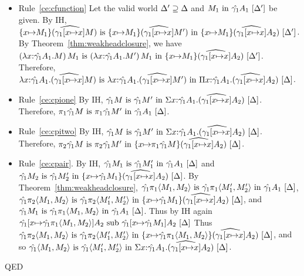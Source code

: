 \documentclass{article}
\theoremstyle{break}
\newcommand{\qed}{\mbox{QED}}
\newcommand{\env}{\gamma}
\newcommand{\envone}{\hat{\env_1}}
\newcommand{\envonex}{\widehat{\env_1[\cvar{\mapsto}\cvar]}}
\newenvironment{proof}{\noindent{\bf Proof:}\hspace*{0.5em}}{\hspace*{\fill}\qed}
\begin{document}
\begin{proof}
\begin{itemize}
\item Rule~\ref{ce:cfunction}
Let the valid world $\Delta'\supseteq\Delta$ and 
$\semanticvalidterm{\world'}{\constructor_1}{\envone\kind_1}$ be given.
By IH, 
$\semanticequivterm{\world'}{\substitute{\cvar}{\constructor_1}{(\envonex\constructor)}}
    {\substitute{\cvar}{\constructor_1}{(\envonex\constructor')}}
    {\substitute{\cvar}{\constructor_1}{(\envonex\kind_2)}}$.
By Theorem~\ref{thm:weakheadclosure}, we have
$\semanticequivterm{\world'}{\capply{(\cfunction{\cvar}{\envone\kind_1}{\constructor})}{\constructor_1}}
    {\capply{(\cfunction{\cvar}{\envone\kind_1}{\constructor'})}{\constructor_1}}
    {\substitute{\cvar}{\constructor_1}{(\envonex\kind_2)}}$.
Therefore,
$\semanticequivterm{\world}{\cfunction{\cvar}{\envone\kind_1}{(\envonex\constructor)}}
    {\cfunction{\cvar}{\envone\kind_1}{(\envonex\constructor')}}
    {\kpi{\cvar}{\envone\kind_1}{(\envonex\kind_2)}}$.

\item Rule~\ref{ce:cpione}
By IH,
$\semanticequivterm{\world}{\envone\constructor}{\envone\constructor'}
    {\ksigma{\cvar}{\envone\kind_1}{(\envonex\kind_2)}}$.
Therefore,
$\semanticequivterm{\world}{\cpi{1}{\envone\constructor}}{\cpi{1}{\envone\constructor'}}{\envone\kind_1}$.

\item Rule~\ref{ce:cpitwo}
By IH,
$\semanticequivterm{\world}{\envone\constructor}{\envone\constructor'}
    {\ksigma{\cvar}{\envone\kind_1}{(\envonex\kind_2)}}$.
Therefore,
$\semanticequivterm{\world}{\cpi{2}{\envone\constructor}}{\cpi{2}{\envone\constructor'}}
    {\substitute{\cvar}{\cpi{1}{\envone\constructor}}{(\envonex\kind_2)}}$.

\item Rule~\ref{ce:cpair}.
By IH,
$\semanticequivterm{\world}{\envone\constructor_1}{\envone\constructor'_1}{\envone\kind_1}$
and
$\semanticequivterm{\world}{\envone\constructor_2}{\envone\constructor'_2}
   {\substitute{\cvar}{\envone\constructor_1}{(\envonex\kind_2)}}$.
By Theorem~\ref{thm:weakheadclosure},
$\semanticequivterm{\world}{\envone\cpi{1}{\cpair{\constructor_1}{\constructor_2}}}
     {\envone\cpi{1}{\cpair{\constructor'_1}{\constructor'_2}}}{\envone\kind_1}$,
$\semanticequivterm{\world}{\envone\cpi{2}{\cpair{\constructor_1}{\constructor_2}}}
     {\envone\cpi{2}{\cpair{\constructor'_1}{\constructor'_2}}}
     {\substitute{\cvar}{\envone\constructor_1}{(\envonex\kind_2)}}$, and
$\semanticequivterm{\world}{\envone\constructor_1}{\envone\cpi{1}{\cpair{\constructor_1}{\constructor_2}}}
    {\envone\kind_1}$.
Thus by IH again
$\semanticsubtype{\world}
   {\envone[\cvar{\mapsto}\envone\cpi{1}{\cpair{\constructor_1}{\constructor_2}}]\kind_2}
   {\envone[\cvar{\mapsto}\envone\constructor_1]\kind_2}$
Thus 
$\semanticequivterm{\world}{\envone\cpi{2}{\cpair{\constructor_1}{\constructor_2}}}
     {\envone\cpi{2}{\cpair{\constructor'_1}{\constructor'_2}}}
     {\substitute{\cvar}{\envone\cpi{1}{\cpair{\constructor_1}{\constructor_2}}}{(\envonex\kind_2)}}$,
and so
$\semanticequivterm{\world}
     {\envone\cpair{\constructor_1}{\constructor_2}}
     {\envone\cpair{\constructor'_1}{\constructor'_2}}
     {\ksigma{\cvar}{\envone\kind_1}{(\envonex\kind_2)}}$.


\end{itemize}
\end{proof}
\end{document}
